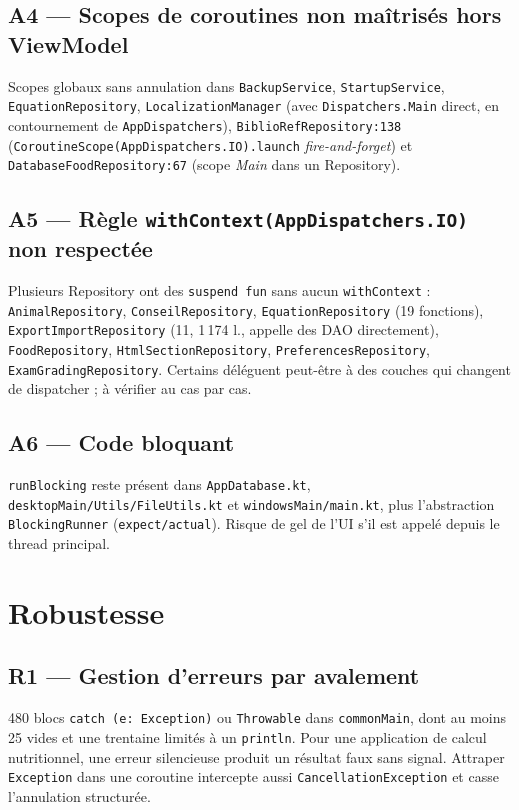 \documentclass[11pt,a4paper]{article}
\newcommand{\code}[1]{\texttt{#1}}
\newcommand{\prio}[1]{\textbf{\textcolor{#1}{\textbullet}}}
\begin{document}
\subsection*{\prio{orange} A4 --- Scopes de coroutines non maîtrisés hors ViewModel}
Scopes globaux sans annulation dans \code{BackupService}, \code{StartupService},
\code{EquationRepository}, \code{LocalizationManager} (avec \code{Dispatchers.Main} direct, en
contournement de \code{AppDispatchers}), \code{BiblioRefRepository:138}
(\code{CoroutineScope(AppDispatchers.IO).launch} \emph{fire-and-forget}) et
\code{DatabaseFoodRepository:67} (scope \emph{Main} dans un Repository).

\subsection*{\prio{orange} A5 --- Règle \code{withContext(AppDispatchers.IO)} non respectée}
Plusieurs Repository ont des \code{suspend fun} sans aucun \code{withContext} :
\code{AnimalRepository}, \code{ConseilRepository}, \code{EquationRepository} (19 fonctions),
\code{ExportImportRepository} (11, 1\,174 l., appelle des DAO directement),
\code{FoodRepository}, \code{HtmlSectionRepository}, \code{PreferencesRepository},
\code{ExamGradingRepository}. Certains déléguent peut-être à des couches qui changent de
dispatcher ; à vérifier au cas par cas.

\subsection*{\prio{gray} A6 --- Code bloquant}
\code{runBlocking} reste présent dans \code{AppDatabase.kt}, \code{desktopMain/Utils/FileUtils.kt}
et \code{windowsMain/main.kt}, plus l'abstraction \code{BlockingRunner} (\code{expect/actual}).
Risque de gel de l'UI s'il est appelé depuis le thread principal.

\section{Robustesse}

\subsection*{\prio{red!80!black} R1 --- Gestion d'erreurs par avalement}
480 blocs \code{catch (e: Exception)} ou \code{Throwable} dans \code{commonMain}, dont au moins
25 vides et une trentaine limités à un \code{println}. Pour une application de calcul
nutritionnel, une erreur silencieuse produit un résultat faux sans signal. Attraper
\code{Exception} dans une coroutine intercepte aussi \code{CancellationException} et casse
l'annulation structurée.
\end{document}
